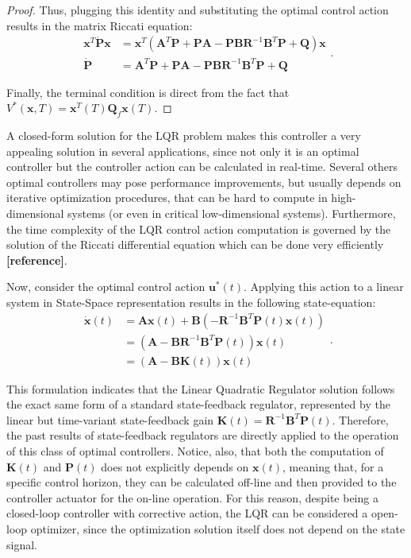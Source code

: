 \documentclass[a4paper,11pt]{book}
\numberwithin{figure}{chapter}
\numberwithin{equation}{chapter}
\numberwithin{table}{chapter}
\theoremstyle{definition}
\begin{document}
\begin{proof}
    Thus, plugging this identity and substituting the optimal control action results in the matrix Riccati equation:
    \begin{equation}
    \begin{split}
    \bm{x}^T \dot{\bm{P}} \bm{x} &= \bm{x}^T (\bm{A}^T \bm{P} + \bm{P} \bm{A} - \bm{P} \bm{B} \bm{R}^{-1} \bm{B}^T \bm{P} + \bm{Q}) \bm{x} \\
    \dot{\bm{P}} &= \bm{A}^T \bm{P} + \bm{P} \bm{A} - \bm{P} \bm{B} \bm{R}^{-1} \bm{B}^T \bm{P} + \bm{Q}
    \end{split}
    .\end{equation}
    
    Finally, the terminal condition is direct from the fact that $V^*(\bm{x}, T) = \bm{x}^T(T) \bm{Q}_f \bm{x}(T)$.
\end{proof}

A closed-form solution for the LQR problem makes this controller a very appealing solution in several applications, since not only it is an optimal controller but the controller action can be calculated in real-time. Several others optimal controllers may pose performance improvements, but usually depends on iterative optimization procedures, that can be hard to compute in high-dimensional systems (or even in critical low-dimensional systems). Furthermore, the time complexity of the LQR control action computation is governed by the solution of the Riccati differential equation which can be done very efficiently \textbf{[reference]}.

Now, consider the optimal control action $\bm{u}^*(t)$. Applying this action to a linear system in State-Space representation results in the following state-equation:
\begin{equation}
\begin{split}
    \dot{\bm{x}}(t) &= \bm{A} \bm{x}(t) + \bm{B} \left( -\bm{R}^{-1} \bm{B}^T \bm{P}(t) \bm{x}(t) \right) \\
        & = \left( \bm{A} - \bm{B} \bm{R}^{-1} \bm{B}^T \bm{P}(t) \right) \bm{x}(t) \\
        & = \left( \bm{A} - \bm{B} \bm{K}(t) \right) \bm{x}(t)
\end{split}
.\end{equation}

This formulation indicates that the Linear Quadratic Regulator solution follows the exact same form of a standard state-feedback regulator, represented by the linear but time-variant state-feedback gain $\bm{K}(t) = \bm{R}^{-1} \bm{B}^T \bm{P}(t)$. Therefore, the past results of state-feedback regulators are directly applied to the operation of this class of optimal controllers. Notice, also, that both the computation of $\bm{K}(t)$ and $\bm{P}(t)$ does not explicitly depends on $\bm{x}(t)$, meaning that, for a specific control horizon, they can be calculated off-line and then provided to the controller actuator for the on-line operation. For this reason, despite being a closed-loop controller with corrective action, the LQR can be considered a open-loop optimizer, since the optimization solution itself does not depend on the state signal.
\end{document}
